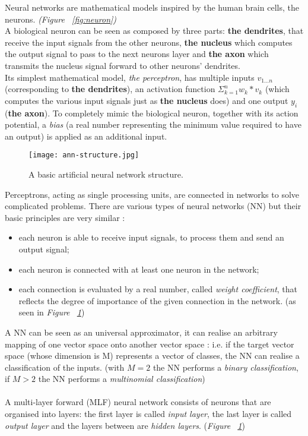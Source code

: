 \documentclass[../main.tex]{subfiles}
\begin{document}
Neural networks are mathematical models inspired by the human brain cells, the neurons. \textit{(Figure ~\ref{fig:neuron})} \\ 
A biological neuron can be seen as composed by three parts: \textbf{the dendrites}, that receive the input signals from the other neurons, \textbf{the nucleus} which computes the output signal to pass to the next neurons layer and \textbf{the axon} which transmits the nucleus signal forward to other neurons' dendrites. \\
Its simplest mathematical model, \textit{the perceptron}, has multiple inputs $v_{1...n}$ (corresponding to \textbf{the dendrites}), an activation function $\Sigma_{k=1}^n w_k*v_k$ (which computes the various input signals just as \textbf{the nucleus} does) and one output $y_i$ (\textbf{the axon}). To completely mimic the biological neuron, together with its action potential, a \textit{bias} (a real number representing the minimum value required to have an output) is applied as an additional input.


\begin{figure}[!b]
  \centering
  \texttt{[image: ann-structure.jpg]}
  \caption{A basic artificial neural network structure.}
  \label{fig:ann-structure}
\end{figure}

Perceptrons, acting as single processing units, are connected in networks to solve complicated problems. There are various types of neural networks (NN) but their basic principles are very similar \cite{Svozil1997}: 
\begin{itemize}
	\item each neuron is able to receive input signals, to process them and send an output signal;
	\item each neuron is connected with at least one neuron in the network; 
	\item each connection is evaluated by a real number, called \textit{weight coefficient}, that reflects the degree of importance of the given connection in the network. (as seen in \textit{Figure ~\ref{fig:ann-structure}})
\end{itemize}
A NN can be seen as an universal approximator, it can realise an arbitrary mapping of one vector space onto another vector space \cite{Svozil1997}: i.e. if the target vector space (whose dimension is M) represents a vector of classes, the NN can realise a classification of the inputs. (with $M=2$ the NN performs a \textit{binary classification}, if $M>2$ the NN performs a \textit{multinomial classification})  \\ \\
A multi-layer forward (MLF) neural network consists of neurons that are organised into layers: the first layer is called \textit{input layer}, the last layer is called \textit{output layer} and the layers between are \textit{hidden layers}. \cite{Svozil1997} (\textit{Figure ~\ref{fig:ann-structure}}) 
\end{document}
